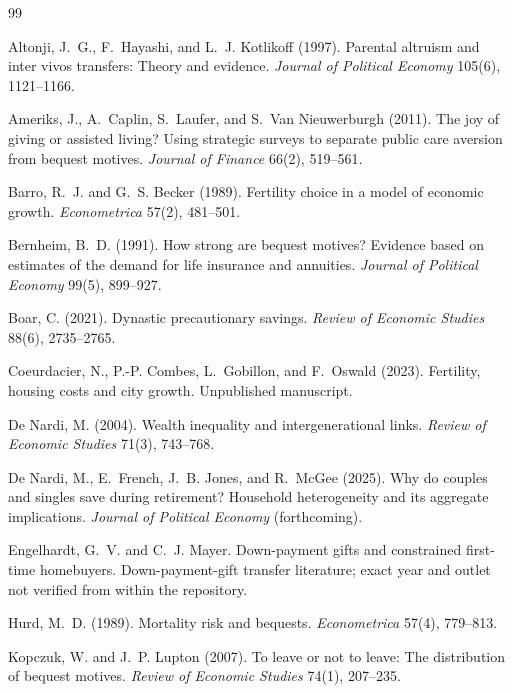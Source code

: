 \documentclass[10pt]{article}
\begin{document}
\begingroup
\small
\begin{thebibliography}{99}

Altonji, J.~G., F.~Hayashi, and L.~J. Kotlikoff (1997).
Parental altruism and inter vivos transfers: Theory and evidence.
\emph{Journal of Political Economy} 105(6), 1121--1166.

Ameriks, J., A.~Caplin, S.~Laufer, and S.~Van Nieuwerburgh (2011).
The joy of giving or assisted living? Using strategic surveys to separate
public care aversion from bequest motives.
\emph{Journal of Finance} 66(2), 519--561.

Barro, R.~J. and G.~S. Becker (1989).
Fertility choice in a model of economic growth.
\emph{Econometrica} 57(2), 481--501.

Bernheim, B.~D. (1991).
How strong are bequest motives? Evidence based on estimates of the demand for
life insurance and annuities.
\emph{Journal of Political Economy} 99(5), 899--927.

Boar, C. (2021).
Dynastic precautionary savings.
\emph{Review of Economic Studies} 88(6), 2735--2765.

Coeurdacier, N., P.-P. Combes, L.~Gobillon, and F.~Oswald (2023).
Fertility, housing costs and city growth. Unpublished manuscript.

De Nardi, M. (2004).
Wealth inequality and intergenerational links.
\emph{Review of Economic Studies} 71(3), 743--768.

De Nardi, M., E.~French, J.~B. Jones, and R.~McGee (2025).
Why do couples and singles save during retirement? Household heterogeneity and
its aggregate implications.
\emph{Journal of Political Economy} (forthcoming).

Engelhardt, G.~V. and C.~J. Mayer.
Down-payment gifts and constrained first-time homebuyers.
Down-payment-gift transfer literature; exact year and outlet not verified from
within the repository.

Hurd, M.~D. (1989).
Mortality risk and bequests.
\emph{Econometrica} 57(4), 779--813.

Kopczuk, W. and J.~P. Lupton (2007).
To leave or not to leave: The distribution of bequest motives.
\emph{Review of Economic Studies} 74(1), 207--235.


\end{thebibliography}
\end{document}
